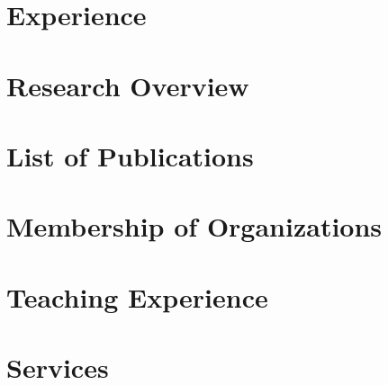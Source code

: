 \documentclass[]{res}
\begin{document}
\begin{resume}
\section{Experience}
\vspace*{0.2in} 
 

\section{Research Overview}
\vspace*{0.1in}



\section{List of Publications}
\vspace*{0.2in}


\section{Membership of Organizations}
\vspace*{0.2in}


\section{Teaching Experience}
\vspace*{0.2in}


\section{Services}
\vspace*{0.2in}

\end{resume}
\end{document}
